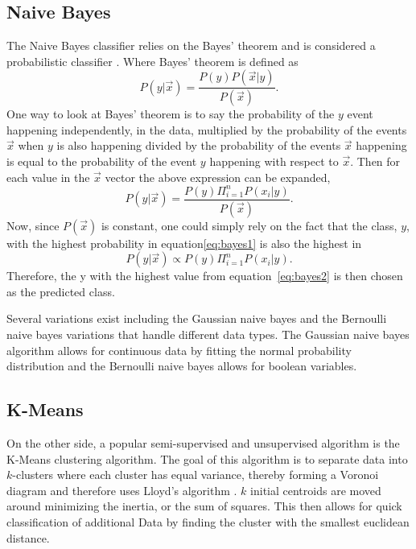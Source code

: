 \subsection{Naive Bayes}

The Naive Bayes classifier relies on the Bayes' theorem and is considered a probabilistic classifier \cite{triola}. Where Bayes' theorem is defined as $$P(y|\vec{x})=\frac{P(y)P(\vec{x}|y)}{P(\vec{x})}.$$ One way to look at Bayes' theorem is to say the probability of the $y$ event happening independently, in the data, multiplied by the probability of the events $\vec{x}$ when $y$ is also happening divided by the probability of the events $\vec{x}$ happening is equal to the probability of the event $y$ happening with respect to $\vec{x}$.
Then for each value in the $\vec{x}$ vector the above expression can be expanded, \begin{equation}\label{eq:bayes1}
	P(y|\vec{x})=\frac{P(y)\Pi_{i=1}^n P(x_i|y)}{P(\vec{x})}.
\end{equation} 
Now, since $P(\vec{x})$ is constant, one could simply rely on the fact that the class, $y$, with the highest probability in equation\ref{eq:bayes1} is also the highest in \begin{equation}\label{eq:bayes2}
	P(y|\vec{x})\propto P(y)\Pi_{i=1}^n P(x_i|y).
\end{equation} Therefore, the y with the highest value from equation~\ref{eq:bayes2} is then chosen as the predicted class.

Several variations exist including the Gaussian naive bayes and the Bernoulli naive bayes variations that handle different data types. The Gaussian naive bayes algorithm allows for continuous data by fitting the normal probability distribution and the Bernoulli naive bayes allows for boolean variables. 

\subsection{K-Means}

On the other side, a popular semi-supervised and unsupervised algorithm is the K-Means clustering algorithm. The goal of this algorithm is to separate data into $k$-clusters where each cluster has equal variance, thereby forming a Voronoi diagram and therefore uses Lloyd's algorithm \cite{lloyd1982least}. $k$ initial centroids are moved around minimizing the inertia, or the sum of squares. This then allows for quick classification of additional Data by finding the cluster with the smallest euclidean distance. 

